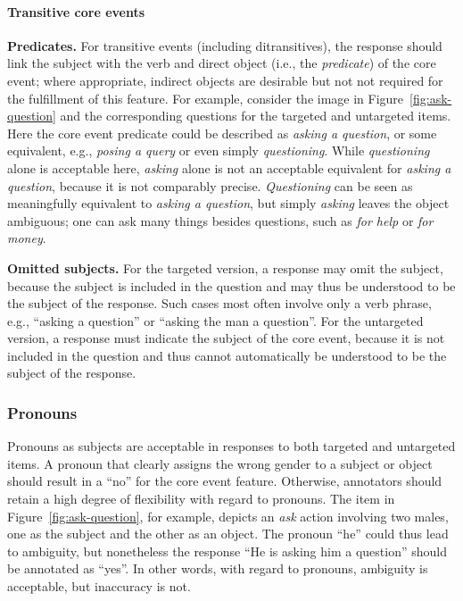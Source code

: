 \documentclass[12pt,notitlepage]{article}
\begin{document}
\paragraph{Transitive core events} \textbf{Predicates.} For transitive events (including ditransitives), the response should link the subject with the verb and direct object (i.e., the \textit{predicate}) of the core event; where appropriate, indirect objects are desirable but not not required for the fulfillment of this feature. For example, consider the image in Figure~\ref{fig:ask-question} and the corresponding questions for the targeted and untargeted items. Here the core event predicate could be described as \textit{asking a question}, or some equivalent, e.g., \textit{posing a query} or even simply \textit{questioning}. While \textit{questioning} alone is acceptable here,
 \textit{asking} alone is not an acceptable equivalent for \textit{asking a question}, because it is not comparably precise. \textit{Questioning} can be seen as meaningfully equivalent to \textit{asking a question}, but simply \textit{asking} leaves the object ambiguous; one can ask many things besides questions, such as \textit{for help} or \textit{for money}.

\textbf{Omitted subjects.} For the targeted version, a response may omit the subject, because the subject is included in the question and may thus be understood to be the subject of the response. Such cases most often involve only a verb phrase, e.g., ``asking a question'' or ``asking the man a question''. For the untargeted version, a response must indicate the subject of the core event, because it is not included in the question and thus cannot automatically be understood to be the subject of the response.

\subsubsection{Pronouns} Pronouns as subjects are acceptable in responses to both targeted and untargeted items. A pronoun that clearly assigns the wrong gender to a subject or object should result in a ``no'' for the core event feature. Otherwise, annotators should retain a high degree of flexibility with regard to pronouns. The item in Figure~\ref{fig:ask-question}, for example, depicts an \textit{ask} action involving two males, one as the subject and the other as an object. The pronoun ``he'' could thus lead to ambiguity, but nonetheless the response ``He is asking him a question'' should be annotated as ``yes''. In other words, with regard to pronouns, ambiguity is acceptable, but inaccuracy is not.
\end{document}
